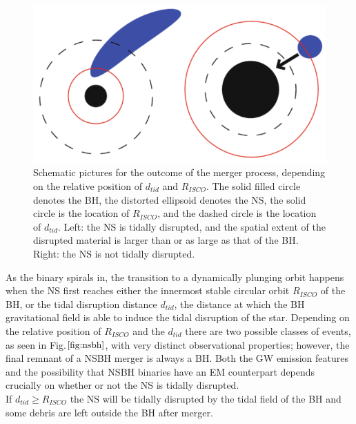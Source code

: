 \documentclass[binding=0.6cm, LaM]{sapthesis}
\begin{document}
                 \begin{figure}[H]
                        \label{nsbh}
                        \includegraphics[scale=0.45]{nsbh}
                        \centering
                        \caption{Schematic pictures for the outcome of the merger process,
                                depending on the relative position of $d_{tid}$ and $R_{ISCO}$.
                                The solid filled circle denotes the BH, the distorted ellipsoid denotes the NS,
                                the solid circle is the location of $R_{ISCO}$, and the dashed circle is the location of  $d_{tid}$.
                                Left: the NS is tidally disrupted, and the spatial extent of the disrupted material
                                is larger than or as large as that of the BH. Right: the NS is not tidally disrupted.}
                         \label{fig:nsbh}
                \end{figure}
        As the binary spirals in, the transition to a dynamically plunging orbit happens
        when the NS first reaches either the innermost stable circular orbit $R_{ISCO}$ of the BH, or the tidal disruption distance $d_{tid}$,
        the distance at which the BH gravitational field is able to induce the tidal disruption of the star.
        Depending on the relative position of $R_{ISCO}$ and the $d_{tid}$ there are
        two possible classes of events, as seen in Fig.$\ref{fig:nsbh}$, with very distinct observational properties;
        however, the final remnant of a NSBH merger is always a BH.
        Both the GW emission features and the possibility that NSBH binaries have an EM counterpart
        depends crucially on whether or not the NS is tidally disrupted. \\
        If $d_{tid} \geq R_{ISCO}$ the NS will be tidally disrupted by the tidal field of the BH
        and some debris are left outside the BH after merger.
\end{document}
